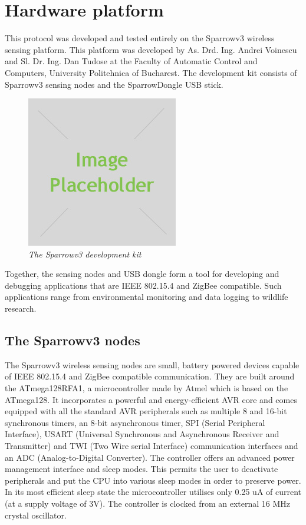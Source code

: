 
\chapter{Hardware platform}

This protocol was developed and tested entirely on the Sparrowv3 wireless
sensing platform. This platform was developed by As. Drd. Ing. Andrei Voinescu
and Sl. Dr. Ing. Dan Tudose at the Faculty of Automatic Control and Computers,
University Politehnica of Bucharest. The development kit consists of Sparrowv3
sensing nodes and the SparrowDongle USB stick.

\begin{figure}[ht]
	\begin{center}
		\includegraphics{img/placeholder.jpg}
	\end{center}
	\caption{\small \itshape{The Sparrowv3 development kit}}
\end{figure}

Together, the sensing nodes and USB dongle form a tool for developing and
debugging applications that are IEEE 802.15.4 and ZigBee compatible. Such
applications range from environmental monitoring and data logging to wildlife
research.

\section{The Sparrowv3 nodes}

The Sparrowv3 wireless sensing nodes are small, battery powered devices capable
of IEEE 802.15.4 and ZigBee compatible communication. They are built around the
\mbox{ATmega128RFA1}, a microcontroller made by Atmel which is based on the
\mbox{ATmega128}. It incorporates a powerful and energy-efficient AVR core and
comes equipped with all the standard AVR peripherals such as multiple 8 and
16-bit synchronous timers, an 8-bit asynchronous timer, SPI (Serial Peripheral
Interface), USART (Universal Synchronous and Asynchronous Receiver and
Transmitter) and TWI (Two Wire serial Interface) communication interfaces and
an ADC (Analog-to-Digital Converter). The controller offers an advanced power
management interface and sleep modes. This permits the user to deactivate
peripherals and put the CPU into various sleep modes in order to preserve
power. In its most efficient sleep state the microcontroller utilises only 0.25
uA of current (at a supply voltage of 3V). The controller is clocked from an
external 16 MHz crystal oscillator.


